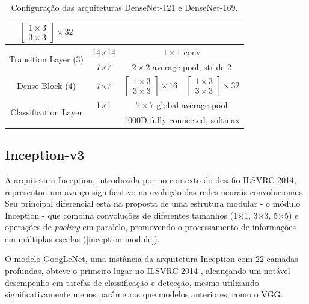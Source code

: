 \begin{table}[h]
\begin{tabular}{|c|c|c|c|}
        $\left[\begin{array}{c}
        1 \times 3 \\
        3 \times 3
        \end{array}\right] \times 32$ \\
        \hline
        \multirow{2}{*}{Transition Layer (3)} & 14×14 & \multicolumn{2}{c|}{$1 \times 1$ conv} \\
        \cline{2-4}
        & 7×7 & \multicolumn{2}{c|}{$2 \times 2$ average pool, stride 2} \\
        \hline
        Dense Block (4) & 7×7 & 
        $\left[\begin{array}{c}
        1 \times 3 \\
        3 \times 3
        \end{array}\right] \times 16$ & 
        $\left[\begin{array}{c}
        1 \times 3 \\
        3 \times 3
        \end{array}\right] \times 32$ \\
        \hline
        \multirow{2}{*}{Classification Layer} & 1×1 & \multicolumn{2}{c|}{$7 \times 7$ global average pool} \\
        \cline{2-4}
        &  & \multicolumn{2}{c|}{1000D fully-connected, softmax} \\
        \hline
    \end{tabular}
    \caption{Configuração das arquiteturas DenseNet-121 e DenseNet-169.}
    \label{densenet-arch}
\end{table}

\subsection{Inception-v3}

A arquitetura Inception, introduzida por \cite{Szegedy2015} no contexto do desafio ILSVRC 2014, representou um avanço significativo na evolução das redes neurais convolucionais. Seu principal diferencial está na proposta de uma estrutura modular - o módulo Inception - que combina convoluções de diferentes tamanhos (1×1, 3×3, 5×5) e operações de \textit{pooling} em paralelo, promovendo o processamento de informações em múltiplas escalas (\autoref{inception-module}).

O modelo GoogLeNet, uma instância da arquitetura Inception com 22 camadas profundas, obteve o primeiro lugar no ILSVRC 2014 \citep{Russakovsky2015}, alcançando um notável desempenho em tarefas de classificação e detecção, mesmo utilizando significativamente menos parâmetros que modelos anteriores, como o VGG.

